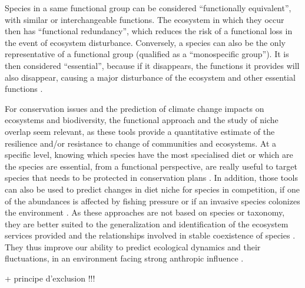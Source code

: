 Species in a same functional group can be considered ``functionally equivalent'', with similar or interchangeable functions. The ecosystem in which they occur then has ``functional redundancy'', which reduces the risk of a functional loss in the event of ecosystem disturbance. Conversely, a species can also be the only representative of a functional group (qualified as a ``monospecific group''). It is then considered ``essential'', because if it disappears, the functions it provides will also disappear, causing a major disturbance of the ecosystem and other essential functions \citep{mejri2009}. 

For conservation issues and the prediction of climate change impacts on ecosystems and biodiversity, the functional approach and the study of niche overlap seem relevant, as these tools provide a quantitative estimate of the resilience and/or resistance to change of communities and ecosystems. 
 At a specific level, knowing which species have the most specialised diet or which are the species are essential, from a functional perspective, are really useful to target species that needs to be protected in conservation plans \citep{cooke2020,mejri2009,norton1995}. In addition, those tools can also be used to predict changes in diet niche for species in competition, if one of the abundances is affected by fishing pressure \citep{diderich2006} or if an invasive species colonizes the environment \citep{albouy2011,geange2011,nagelkerke2018}. As these approaches are not based on species or taxonomy, they are better suited to the generalization and identification of the ecosystem services provided \citep{martini2020,mcgill2006} and the relationships involved in stable coexistence of species \citep{albouy2011}. They thus improve our ability to predict ecological dynamics and their fluctuations, in an environment facing strong anthropic influence \citep{kremer2017}. 

+ principe d'exclusion !!!